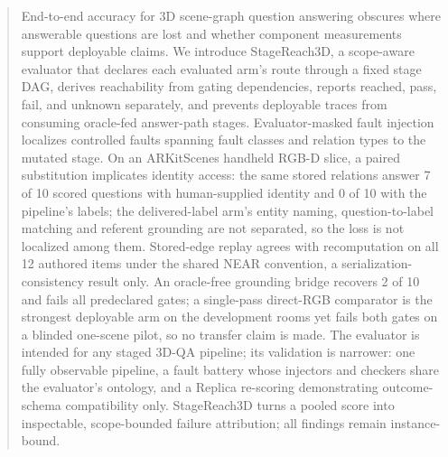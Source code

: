 \begin{abstract}
End-to-end accuracy for 3D scene-graph question answering obscures where
answerable questions are lost and whether component measurements support
deployable claims. We introduce StageReach3D, a scope-aware evaluator that
declares each evaluated arm's route through a fixed stage DAG, derives
reachability from gating dependencies, reports reached, pass, fail, and
unknown separately, and prevents deployable traces from consuming oracle-fed
answer-path stages. Evaluator-masked fault injection localizes \SRFaultLocalized{}
controlled faults spanning \SRFaultClasses{} fault classes and
\SRFaultRelationTypes{} relation types to the mutated stage. On an
ARKitScenes handheld RGB-D slice, a paired substitution implicates identity
access: the same stored relations answer 7 of 10 scored questions with
human-supplied identity and 0 of 10 with the pipeline's labels; the
delivered-label arm's entity naming, question-to-label matching and referent
grounding are not separated, so the loss is not localized among them.
Stored-edge replay agrees with recomputation on all 12 authored items under
the shared NEAR convention, a serialization-consistency result only. An
oracle-free grounding bridge recovers 2 of 10 and fails all predeclared
gates; a single-pass direct-RGB comparator is the strongest deployable arm on the
development rooms yet fails both gates on a blinded one-scene pilot, so no transfer
claim is made. The evaluator is intended for any staged 3D-QA
pipeline; its validation is narrower: one fully observable pipeline, a fault
battery whose injectors and checkers share the evaluator's ontology, and a
Replica re-scoring demonstrating outcome-schema compatibility only.
StageReach3D turns a pooled score into inspectable, scope-bounded failure
attribution; all findings remain instance-bound.
\end{abstract}
